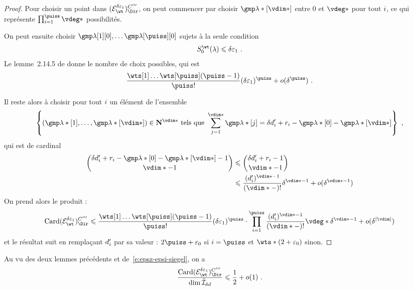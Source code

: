 \begin{proof}
  Pour choisir un point dans \( (\stairs)\Ciii \), on peut commencer par
  choisir \( \imp*[\vdim*] \) entre \( 0 \) et \( \vdeg* \)
  pour tout \( i \), ce qui représente \( \prod\fctrange \vdeg* \)
  possibilités.

  On peut ensuite choisir \( \imp[1][0], \dots \imp[\puiss][0] \)
  sujets à la seule condition
  \begin{equation}
    \wtsum*(\lambda) \le \delta \epsi \pmm.
  \end{equation}
  Le lemme~2.14.5 de \cite{farhith} donne le nombre de choix possibles, qui
  est
  \begin{equation}
    \frac {\prodwt} {\puiss !} (\delta\epsi)^\puiss
    + o(\delta^\puiss)
    \pmm.
  \end{equation}

  Il reste alors à choisir pour tout \( i \) un élément de l'ensemble
  \begin{equation}
    \left\{
      (\imp*[1],  \dots, \imp*[\vdim*])
      \in \N ^{\vdim*}
      \text{ tels que }
      \sum_{j=1}^{\vdim*} \imp*[j]
      =
      \delta d'_\fct + r_\fct - \imp*[0] - \imp*[\vdim*]
    \right\}
    \pmm,
  \end{equation}
  qui est de cardinal
  \begin{align}
    \binom {
      \delta d'_\fct + r_\fct - \imp*[0] - \imp*[\vdim*] - 1
      }{
      \vdim* - 1
      }
    & \le
    \binom {
      \delta d'_\fct + r_\fct - 1
      }{
      \vdim* - 1
      }
    \\
    & \le
    \frac {(d'_\fct)^{\vdim* - 1}} {(\vdim* - )!} \delta^{\vdim* - 1}
    + o( \delta^{\vdim* - 1} )
  \end{align}
  On prend alors le produit :
  \begin{equation}
    \card (\stairs)\Ciii
    \le
    \frac {\prodwt} {\puiss !} (\delta\epsi)^\puiss
    \cdot \prod\fctrange
    \frac {(d'_\fct)^{\vdim* - 1}} {(\vdim* - )!}
    \vdeg* \delta^{\vdim* - 1}
    + o( \delta^{\lgr\vdim} )
  \end{equation}
  et le résultat suit en remplaçant \( d'_i \) par sa valeur : \( 2\puiss +
  \epsz \) si \( \fct = \puiss \) et \( \wts* (2 + \epsz) \) sinon.
\end{proof}

Au vu des deux lemmes précédents et de~\eqref{e:epsz-epsi-siegel}, on a
\begin{equation} \label{e:good-codim}
  \frac {\card (\stairs)\Ciii} {\dim \ideala{\delta d}}
  \le
  \frac12 + o(1)
  \pmm.
\end{equation}

